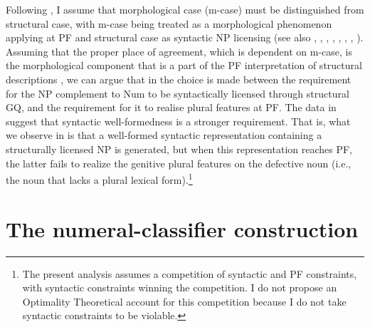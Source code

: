 \documentclass[output=paper,
modfonts,
newtxmath,
hidelinks
]{langscibook}
\begin{document}
Following \citet{Bobaljik2008}, I assume that morphological case (m-case) must be distinguished from structural case, with m-case being treated as a morphological phenomenon applying at PF and structural case as syntactic NP licensing (see also \citealt{Harley1995}, \citealt{Marantz2000}, \citealt{McFadden2004}, \citealt{Schütze1997}, \citealt{Sigurðsson1991},  \citealt{Sigurðsson2003}, \citealt{Yip-etal1987}, \citealt{Zaenen-etal1985}). Assuming that the proper place of agreement, which is dependent on m-case, is the morphological component that is a part of the PF interpretation of structural descriptions \citep{Bobaljik2008}, we can argue that in  the choice is made between the requirement for the NP complement to Num to be syntactically licensed through structural GQ, and the requirement for it to realise plural features at PF. The data in  suggest that syntactic well-formedness is a stronger requirement. That is, what we observe in  is that a well-formed syntactic representation containing a structurally licensed NP is generated, but when this representation reaches PF, the latter fails to realize the genitive plural features on the defective noun (i.e., the noun that lacks a plural lexical form).\footnote{\label{18:fn6}The present analysis assumes a competition of syntactic and PF constraints, with syntactic constraints winning the competition. I do not propose an Optimality Theoretical account for this competition because I do not take syntactic constraints to be violable.}

\section{The numeral-classifier construction}\label{18:s2}
\end{document}
